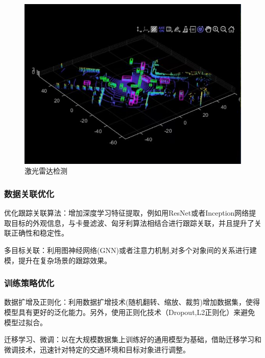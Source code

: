 \begin{figure}[htbp] %
	\centering
	\includegraphics[width=1\textwidth]{p40} %
	\caption{激光雷达检测} %
	\label{fig:p40} %
\end{figure}







\subsubsection{数据关联优化}

优化跟踪关联算法：增加深度学习特征提取，例如用ResNet或者Inception网络提取目标的外观信息，与卡曼滤波、匈牙利算法相结合进行跟踪关联，并且提升了关联正确性和稳定性。

多目标关联：利用图神经网络(GNN)或者注意力机制,对多个对象间的关系进行建模，提升在复杂场景的跟踪效果。

\subsubsection{训练策略优化}

数据扩增及正则化：利用数据扩增技术(随机翻转、缩放、裁剪)增加数据集，使得模型具有更好的泛化能力。另外，使用正则化技术（Dropout,L2正则化）来避免模型过拟合。

迁移学习、微调：以在大规模数据集上训练好的通用模型为基础，借助迁移学习和微调技术，迅速针对特定的交通环境和目标对象进行调整。


